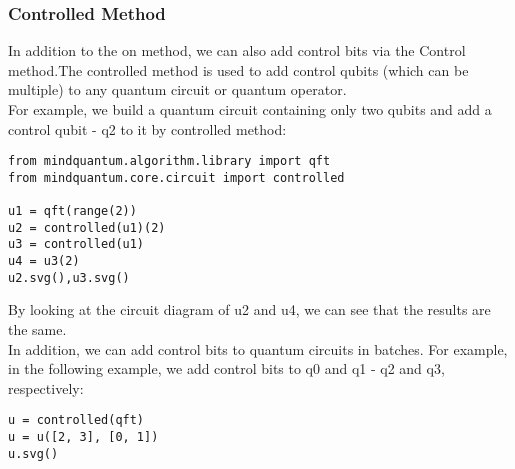 \subsubsection{Controlled Method}
In addition to the on method, we can also add control bits via the Control method.The controlled method is used to add control qubits (which can be multiple) to any quantum circuit or quantum operator.\\
For example, we build a quantum circuit containing only two qubits and add a control qubit - q2 to it by controlled method:
\begin{lstlisting}
from mindquantum.algorithm.library import qft
from mindquantum.core.circuit import controlled

u1 = qft(range(2))
u2 = controlled(u1)(2)
u3 = controlled(u1)
u4 = u3(2)
u2.svg(),u3.svg()
\end{lstlisting}
By looking at the circuit diagram of u2 and u4, we can see that the results are the same.\\
In addition, we can add control bits to quantum circuits in batches. For example, in the following example, we add control bits to q0 and q1 - q2 and q3, respectively:
\begin{lstlisting}
u = controlled(qft)
u = u([2, 3], [0, 1])
u.svg()
\end{lstlisting}

% 
